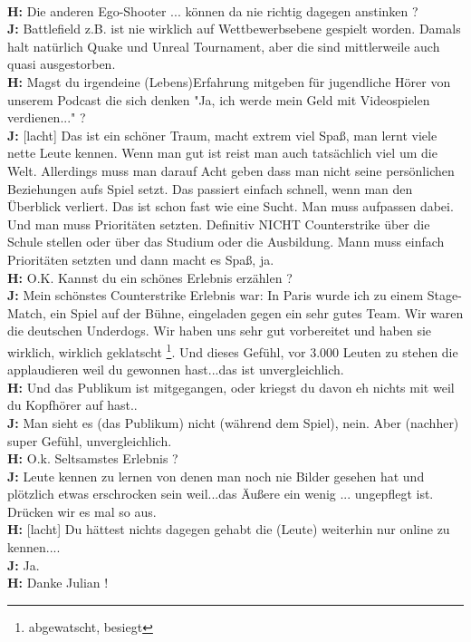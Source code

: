 \\ \textbf{H:} Die anderen Ego-Shooter ... können da nie richtig dagegen anstinken ?
\\ \textbf{J:} Battlefield z.B. ist nie wirklich auf Wettbewerbsebene gespielt worden. Damals halt natürlich Quake und Unreal Tournament, aber die sind mittlerweile auch quasi ausgestorben.
\\ \textbf{H:} Magst du irgendeine (Lebens)Erfahrung mitgeben für jugendliche Hörer von unserem Podcast die sich denken "Ja, ich werde mein Geld mit Videospielen verdienen..." ?
\\ \textbf{J:} [lacht] Das ist ein schöner Traum, macht extrem viel Spaß, man lernt viele nette Leute kennen. Wenn man gut ist reist man auch tatsächlich viel um die Welt. Allerdings muss man darauf Acht geben dass man nicht seine persönlichen Beziehungen aufs Spiel setzt. Das passiert einfach schnell, wenn man den Überblick verliert. Das ist schon fast wie eine Sucht. Man muss aufpassen dabei. Und man muss Prioritäten setzten. Definitiv NICHT Counterstrike über die Schule stellen oder über das Studium oder die Ausbildung. Mann muss einfach Prioritäten setzten und dann macht es Spaß, ja.
\\ \textbf{H:} O.K. Kannst du ein schönes Erlebnis erzählen ?
\\ \textbf{J:} Mein schönstes Counterstrike Erlebnis war: In Paris wurde ich zu einem Stage-Match, ein Spiel auf der Bühne, eingeladen gegen ein sehr gutes Team. Wir waren die deutschen Underdogs. Wir haben uns sehr gut vorbereitet und haben sie wirklich, wirklich geklatscht \footnote{abgewatscht, besiegt}. Und dieses Gefühl, vor 3.000 Leuten zu stehen die applaudieren weil du gewonnen hast...das ist unvergleichlich.
\\ \textbf{H:} Und das Publikum ist mitgegangen, oder kriegst du davon eh nichts mit weil du Kopfhörer auf hast..
\\ \textbf{J:} Man sieht es (das Publikum) nicht (während dem Spiel), nein. Aber (nachher) super Gefühl, unvergleichlich.
\\ \textbf{H:} O.k. Seltsamstes Erlebnis ?
\\ \textbf{J:} Leute kennen zu lernen von denen man noch nie Bilder gesehen hat und plötzlich etwas erschrocken sein weil...das Äußere ein wenig ... ungepflegt ist. Drücken wir es mal so aus.
\\ \textbf{H:} [lacht] Du hättest nichts dagegen gehabt die (Leute) weiterhin nur online zu kennen....
\\ \textbf{J:} Ja.
\\ \textbf{H:} Danke Julian !


